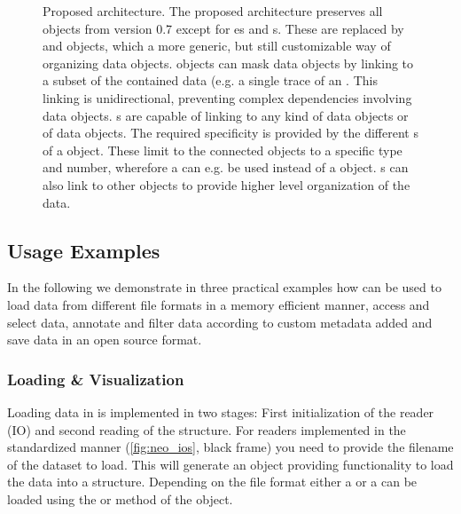 \begin{figure}
    \centering
    
    \caption[Proposed  architecture]{Proposed  architecture. The proposed  architecture preserves all objects from  version 0.7 except for es and s. These are replaced by  and  objects, which a more generic, but still customizable way of organizing data objects.  objects can mask data objects by linking to a subset of the contained data (e.g. a single trace of an . This linking is unidirectional, preventing complex dependencies involving data objects. s are capable of linking to any kind of data objects or  of data objects. The required specificity is provided by the different s of a  object. These limit to the connected objects to a specific type and number, wherefore a  can e.g. be used instead of a  object. s can also link to other  objects to provide higher level organization of the data.}
    \label{fig:neo_architecture_future}
\end{figure}


\subsection{Usage Examples}
In the following we demonstrate in three practical examples how  can be used to load data from different file formats in a memory efficient manner, access and select data, annotate and filter data according to custom metadata added and save data in an open source format.

\subsubsection{Loading \& Visualization}
Loading data in  is implemented in two stages: First initialization of the reader (IO) and second reading of the  structure. For readers implemented in the standardized manner (\cref{fig:neo_ios}, black frame) you need to provide the filename of the dataset to load. This will generate an  object providing functionality to load the data into a  structure. Depending on the file format either a   or a   can be loaded using the  or  method of the  object.

